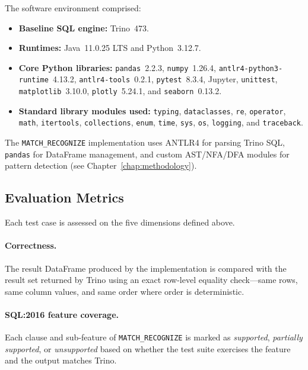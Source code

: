 The software environment comprised:
\begin{itemize}
  \item \textbf{Baseline SQL engine:} Trino~473.
  \item \textbf{Runtimes:} Java~11.0.25 LTS and Python~3.12.7.
  \item \textbf{Core Python libraries:} \texttt{pandas}~2.2.3,
    \texttt{numpy}~1.26.4,
    \texttt{antlr4-python3-runtime}~4.13.2,
    \texttt{antlr4-tools}~0.2.1,
    \texttt{pytest}~8.3.4,
    Jupyter,
    \texttt{unittest},
    \texttt{matplotlib}~3.10.0,
    \texttt{plotly}~5.24.1, and
    \texttt{seaborn}~0.13.2.
  \item \textbf{Standard library modules used:}
    \texttt{typing}, \texttt{dataclasses}, \texttt{re},
    \texttt{operator}, \texttt{math}, \texttt{itertools},
    \texttt{collections}, \texttt{enum}, \texttt{time},
    \texttt{sys}, \texttt{os}, \texttt{logging}, and
    \texttt{traceback}.
\end{itemize}

The \texttt{MATCH\_RECOGNIZE} implementation uses ANTLR4 for
parsing Trino SQL, \texttt{pandas} for DataFrame management, and
custom AST/NFA/DFA modules for pattern detection (see
Chapter~\ref{chap:methodology}).

\subsection{Evaluation Metrics}
\label{subsec:eval-metrics}

Each test case is assessed on the five dimensions defined above.

\paragraph{Correctness.}
The result DataFrame produced by the implementation is compared
with the result set returned by Trino using an exact row-level
equality check---same rows, same column values, and same order
where order is deterministic.

\paragraph{SQL:2016 feature coverage.}
Each clause and sub-feature of \texttt{MATCH\_RECOGNIZE} is marked
as \emph{supported}, \emph{partially supported}, or
\emph{unsupported} based on whether the test suite exercises the
feature and the output matches Trino.

